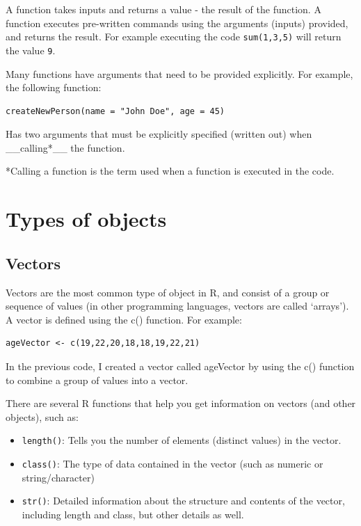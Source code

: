 \documentclass[]{book}
\providecommand{\tightlist}{%
  \setlength{\itemsep}{0pt}\setlength{\parskip}{0pt}}
\begin{document}
A function takes inputs and returns a value - the result of the function. A function executes pre-written commands using the arguments (inputs) provided, and returns the result. For example executing the code \texttt{sum(1,3,5)} will return the value \texttt{9}.

Many functions have arguments that need to be provided explicitly. For example, the following function:

\begin{verbatim}
createNewPerson(name = "John Doe", age = 45)
\end{verbatim}

Has two arguments that must be explicitly specified (written out) when \_\_calling*\_\_ the function.

*Calling a function is the term used when a function is executed in the code.

\hypertarget{types-of-objects}{%
\section{Types of objects}\label{types-of-objects}}

\hypertarget{vectors}{%
\subsection{Vectors}\label{vectors}}

Vectors are the most common type of object in R, and consist of a group or sequence of values (in other programming languages, vectors are called `arrays'). A vector is defined using the c() function. For example:

\begin{verbatim}
ageVector <- c(19,22,20,18,18,19,22,21)
\end{verbatim}

In the previous code, I created a vector called ageVector by using the c() function to combine a group of values into a vector.

There are several R functions that help you get information on vectors (and other objects), such as:

\begin{itemize}
\tightlist
\item
  \texttt{length()}: Tells you the number of elements (distinct values) in the vector.
\item
  \texttt{class()}: The type of data contained in the vector (such as numeric or string/character)
\item
  \texttt{str()}: Detailed information about the structure and contents of the vector, including length and class, but other details as well.
\end{itemize}
\end{document}
